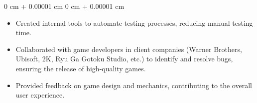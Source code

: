 \documentclass[10pt, letterpaper]{article}
\newenvironment{highlights}{
    \begin{itemize}[
        topsep=0.10 cm,
        parsep=0.10 cm,
        partopsep=0pt,
        itemsep=0pt,
        leftmargin=0 cm + 10pt
    ]
}{
    \end{itemize}
} %
\newenvironment{onecolentry}{
    \begin{adjustwidth}{
        0 cm + 0.00001 cm
    }{
        0 cm + 0.00001 cm
    }
}{
    \end{adjustwidth}
} %
\newenvironment{twocolentry}[2][]{
    \onecolentry
    \def\secondColumn{#2}
    \setcolumnwidth{\fill, 6.5 cm}
    \begin{paracol}{2}
}{
    \switchcolumn \raggedleft \secondColumn
    \end{paracol}
    \endonecolentry
} %
\begin{document}
        \vspace{0.10 cm}
        \begin{onecolentry}
            \begin{highlights}
                \item Created internal tools to automate testing processes, reducing manual testing time.
                \item Collaborated with game developers in client companies (Warner Brothers, Ubisoft, 2K, Ryu Ga Gotoku Studio, etc.) to identify and resolve bugs, ensuring the release of high-quality games.
                \item Provided feedback on game design and mechanics, contributing to the overall user experience.
            \end{highlights}
        \end{onecolentry}



            

\end{document}
